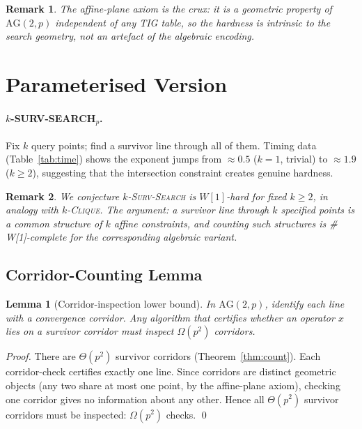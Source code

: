 \documentclass[11pt]{article}
\newtheorem{lemma}[theorem]{Lemma}
\newtheorem{remark}{Remark}
\begin{document}
\begin{remark}
The affine-plane axiom is the crux: it is a geometric property of
$\mathrm{AG}(2,p)$ independent of any TIG table, so the hardness
is intrinsic to the search geometry, not an artefact of the
algebraic encoding.
\end{remark}



\section{Parameterised Version}

\paragraph{$k$-\textup{SURV-SEARCH}$_p$.}
Fix $k$ query points; find a survivor line through all of them.
Timing data (Table~\ref{tab:time}) shows the exponent jumps from
$\approx0.5$ ($k=1$, trivial) to $\approx1.9$ ($k\ge2$),
suggesting that the intersection constraint creates genuine hardness.

\begin{remark}
We conjecture $k$-\textsc{Surv-Search} is $W[1]$-hard for fixed $k\ge2$,
in analogy with $k$-\textsc{Clique}.
The argument: a survivor line through $k$ specified points is
a common structure of $k$ affine constraints, and counting such
structures is \#\,W[1]-complete for the corresponding algebraic variant.
\end{remark}


\subsection*{Corridor-Counting Lemma}

\begin{lemma}[Corridor-inspection lower bound]\label{lem:corridor}
In $\mathrm{AG}(2,p)$, identify each line with a \emph{convergence corridor}.
Any algorithm that certifies whether an operator $x$ lies on a survivor corridor
must inspect $\Omega(p^2)$ corridors.
\end{lemma}

\begin{proof}
There are $\Theta(p^2)$ survivor corridors (Theorem~\ref{thm:count}).
Each corridor-check certifies exactly one line.
Since corridors are distinct geometric objects (any two share at most one point,
by the affine-plane axiom), checking one corridor gives no information about
any other.
Hence all $\Theta(p^2)$ survivor corridors must be inspected: $\Omega(p^2)$ checks.  \qed
\end{proof}
\end{document}

